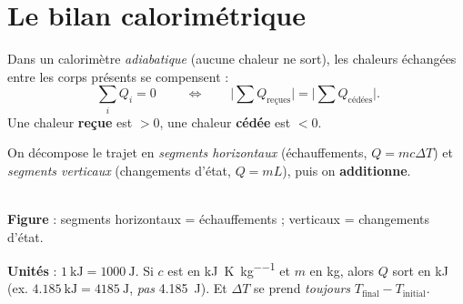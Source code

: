 \documentclass[11pt,a4paper]{article}
\begin{document}
\section{Le bilan calorimétrique}

\begin{proprieteb}
Dans un calorimètre \emph{adiabatique} (aucune chaleur ne sort), les chaleurs échangées entre les corps
présents se compensent :
\[ \boxed{\;\sum_i Q_i = 0\;} \qquad\Longleftrightarrow\qquad
   \big|\textstyle\sum Q_{\text{reçues}}\big| = \big|\textstyle\sum Q_{\text{cédées}}\big|. \]
Une chaleur \textbf{reçue} est $>0$, une chaleur \textbf{cédée} est $<0$.
\end{proprieteb}

\begin{methodeb}
On décompose le trajet en \emph{segments horizontaux} (échauffements, $Q=mc\Delta T$) et \emph{segments
verticaux} (changements d'état, $Q=mL$), puis on \textbf{additionne}.
\end{methodeb}

\begin{center}
\\[2pt]
{\small\textbf{\textcolor{primary}{Figure}} : segments \textcolor{endocol}{horizontaux} = échauffements ;
\textcolor{chaleur}{verticaux} = changements d'état.}
\end{center}

\begin{attentionb}
\textbf{Unités} : $\SI{1}{\kilo\joule}=\SI{1000}{\joule}$. Si $c$ est en \si{\kilo\joule\per\kelvin\per\kilogram}
et $m$ en \si{\kilogram}, alors $Q$ sort en \si{\kilo\joule} (ex. $\SI{4.185}{\kilo\joule}=\SI{4185}{\joule}$,
\emph{pas} \SI{4.185}{\joule}). Et $\Delta T$ se prend \emph{toujours} $T_{\text{final}}-T_{\text{initial}}$.
\end{attentionb}
\end{document}
